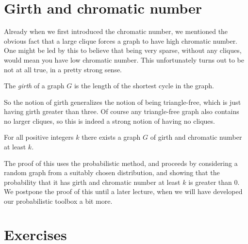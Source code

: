 \documentclass[nobib]{tufte-handout}
\begin{document}
\section{Girth and chromatic number}

Already when we first introduced the chromatic number, we mentioned the obvious fact that a large clique forces a graph to have high chromatic number. One might be led by this to believe that being very sparse, without any cliques, would mean you have low chromatic number. This unfortunately turns out to be not at all true, in a pretty strong sense.

\begin{definition}
  The \emph{girth} of a graph $G$ is the length of the shortest cycle in the graph.
\end{definition}

So the notion of girth generalizes the notion of being triangle-free, which is just having girth greater than three. Of course any triangle-free graph also contains no larger cliques, so this is indeed a strong notion of having no cliques.

\begin{theorem}[Erd\H{o}s, 1959]
  For all positive integers $k$ there exists a graph $G$ of girth and chromatic number at least $k$.
\end{theorem}

The proof of this uses the probabilistic method, and proceeds by considering a random graph from a suitably chosen distribution, and showing that the probability that it has girth and chromatic number at least $k$ is greater than $0$. We postpone the proof of this until a later lecture, when we will have developed our probabilistic toolbox a bit more.


\section{Exercises}


%
%
\end{document}
